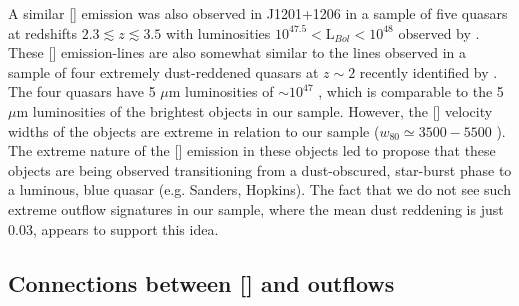 A similar [] emission was also observed in J1201+1206 in a sample of five quasars at redshifts $2.3 \lesssim z \lesssim 3.5$ with luminosities $10^{47.5} < {\mathrm L_{Bol}} < 10^{48}$ \ergs observed by \citet{bischetti16}.
These [] emission-lines are also somewhat similar to the lines observed in a sample of four extremely dust-reddened quasars at $z\sim2$ recently identified by \citet{zakamska16}. 
The four \citet{zakamska16} quasars have 5 $\mu$m luminosities of $\sim10^{47}$ \ergs, which is comparable to the 5 $\mu$m luminosities of the brightest objects in our sample. 
However, the [] velocity widths of the \citet{zakamska16} objects are extreme in relation to our sample ($w_{80} \simeq 3500-5500$ \kms). 
The extreme nature of the [] emission in these objects led \citet{zakamska16} to propose that these objects are being observed transitioning from a dust-obscured, star-burst phase to a luminous, blue quasar (e.g. Sanders, Hopkins).
The fact that we do not see such extreme outflow signatures in our sample, where the mean dust reddening is just 0.03, appears to support this idea.     

\subsection{Connections between [] and  outflows}

